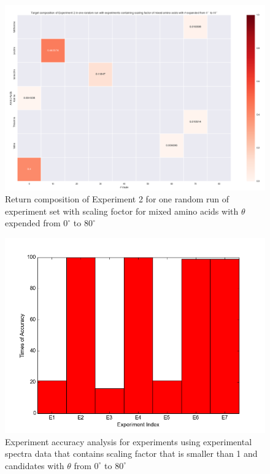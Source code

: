 \begin{figure}[!ht] 
\centering
\includegraphics[scale=0.4]{Figures/chapter6_figure_two.png}
\caption{Return composition of Experiment 2 for one random run of experiment set with scaling foctor for mixed amino acids with $\theta$ expended from $0^{\circ}$ to $80^{\circ}$} \label{fig:6.2}
\end{figure}

\begin{figure}[!ht] 
\centering
\includegraphics[scale=0.5]{Figures/chapter6_1.png}
\caption{Experiment accuracy analysis for experiments using experimental spectra data that contains scaling factor that is smaller than 1 and candidates with $\theta$ from $0^{\circ}$ to $80^{\circ}$}
\label{fig:6.3}
\end{figure}

